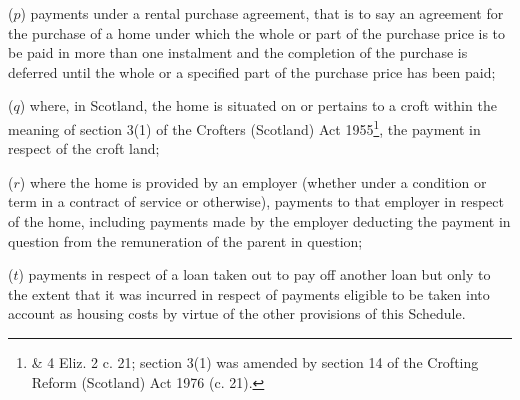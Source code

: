 \documentclass[12pt,a4paper]{article}
\begin{document}
\begin{enumerate}
($p$) payments under a rental purchase agreement, that is to say an agreement for the purchase of a home under which the whole or part of the purchase price is to be paid in more than one instalment and the completion of the purchase is deferred until the whole or a specified part of the purchase price has been paid;

($q$) where, in Scotland, the home is situated on or pertains to a croft within the meaning of section 3(1) of the Crofters (Scotland) Act 1955\footnote{ \& 4 Eliz. 2 c. 21; section 3(1) was amended by section 14 of the Crofting Reform (Scotland) Act 1976 (c. 21).}, the payment in respect of the croft land;

($r$) where the home is provided by an employer (whether under a condition or term in a contract of service or otherwise), payments to that employer in respect of the home, including payments made by the employer deducting the payment in question from the remuneration of the parent in question;


($t$) payments in respect of a loan taken out to pay off another loan but only to the extent that it was incurred 
in respect of payments eligible to be taken into account as housing costs by virtue of the other provisions of this Schedule.  %
\end{enumerate}

\end{document}
